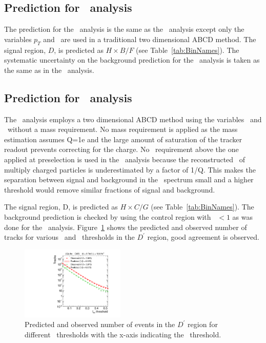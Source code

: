 \subsection{Prediction for \tkonly\ analysis}

The prediction for the \tkonly\ analysis is the same as the \tktof\ analysis except only the variables $p_T$ and \ias\ are used in a traditional two
dimensional ABCD method. 
The signal region, $D$, is predicted as $H \times B / F$ (see Table~\ref{tab:BinNames}).
The systematic uncertainty on the background prediction for the \tkonly\ analysis is taken as the same as in the \tktof\ analysis.

\subsection{Prediction for \multi\ analysis}

The \multi\ analysis employs a two dimensional ABCD method using the variables \invbeta\ and \ias\ without a mass requirement. No mass requirement is applied as the mass
estimation assumes Q=1e and the large amount of saturation of the tracker readout prevents correcting for the charge.
No \pt\ requirement above the one applied at preselection is used in the \multi\ analysis because the reconstructed \pt\ of
multiply charged particles is underestimated by a factor of 1/Q. This makes the separation between signal and background in the \pt\ spectrum small and a
higher threshold would remove similar fractions of signal and background.

The signal region, D, is predicted as $H \times C / G$ (see Table~\ref{tab:BinNames}).
The background prediction is checked by using 
the control region with \invbeta\ $< 1$ as was done for the \muononly\ analysis.
Figure~\ref{fig:MultiPred} shows the predicted and observed number of tracks for various \invbeta\ and \ias\ thresholds in the $D^{\prime}$ region, good agreement is observed.

\begin{figure}
 \begin{center}
  \includegraphics[clip=true, trim=0.0cm 0cm 2.8cm 0cm,width=0.44\textwidth]{figures/multi/Prediction_Data8TeV_NPredVsNObs_Flip}
 \end{center}
 \caption[Predicted and observed number of events in the \invbeta\ $<$ 1 region for different sets of thresholds in the \multi\ analysis.]
{Predicted and observed number of events in the $D^{\prime}$ region for different \invbeta\ thresholds with the x-axis indicating the \ias\ threshold.}
\label{fig:MultiPred}
\end{figure}

